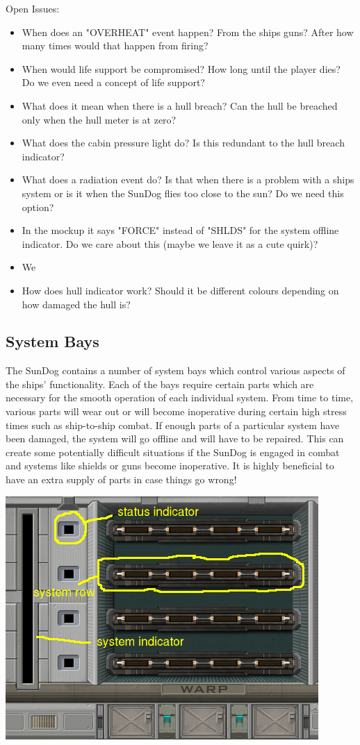 Open Issues:
\begin{itemize}
\item When does an "OVERHEAT" event happen?  From the ships guns?  After
how many times would that happen from firing?
\item When would life support be compromised?  How long until the player dies?
Do we even need a concept of life support?
\item What does it mean when there is a hull breach?  Can the hull be breached
only when the hull meter is at zero?
\item What does the cabin pressure light do?  Is this redundant to 
the hull breach indicator?
\item What does a radiation event do?  Is that when there is a problem with
a ships system or is it when the SunDog flies too close to the sun?  Do
we need this option?
\item In the mockup it says "FORCE" instead of "SHLDS" for the system
offline indicator.  Do we care about this (maybe we leave it as a cute
quirk)?
\item We 
\item How does hull indicator work?  Should it be different colours depending
on how damaged the hull is?
\end{itemize}

\subsection{System Bays}
The SunDog contains a number of system bays which control various aspects of
the ships' functionality.  Each of the bays require certain parts which are
necessary for the smooth operation of each individual system.  From time to
time, various parts will wear out or will become inoperative during certain
high stress times such as ship-to-ship combat.  If enough parts of a particular
system have been damaged, the system will go offline and will have to be
repaired.  This can create some potentially difficult situations if the
SunDog is engaged in combat and systems like shields or guns become
inoperative.  It is highly beneficial to have an extra supply of parts in
case things go wrong!

\includegraphics[scale=0.70]{images/interior-warp.png}

